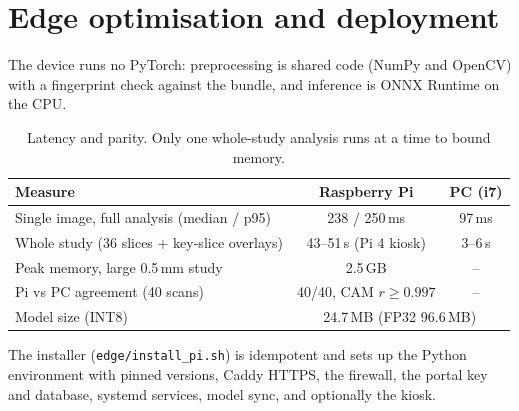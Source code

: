\documentclass[11pt,a4paper]{article}
\begin{document}
\section{Edge optimisation and deployment}
The device runs no PyTorch: preprocessing is shared code (NumPy and OpenCV) with a fingerprint check against the
bundle, and inference is ONNX Runtime on the CPU.
\begin{table}[H]\centering\small
\begin{tabular}{@{}lcc@{}}
\toprule
\textbf{Measure} & \textbf{Raspberry Pi} & \textbf{PC (i7)} \\
\midrule
Single image, full analysis (median / p95) & 238 / 250\,ms & 97\,ms \\
Whole study (36 slices + key-slice overlays) & 43--51\,s (Pi 4 kiosk) & 3--6\,s \\
Peak memory, large 0.5\,mm study & 2.5\,GB & -- \\
Pi vs PC agreement (40 scans) & 40/40, CAM $r \ge 0.997$ & -- \\
Model size (INT8) & \multicolumn{2}{c}{24.7\,MB (FP32 96.6\,MB)} \\
\bottomrule
\end{tabular}
\caption{Latency and parity. Only one whole-study analysis runs at a time to bound memory.}
\end{table}
The installer (\texttt{edge/install\_pi.sh}) is idempotent and sets up the Python environment with pinned versions,
Caddy HTTPS, the firewall, the portal key and database, systemd services, model sync, and optionally the kiosk.

\end{document}
